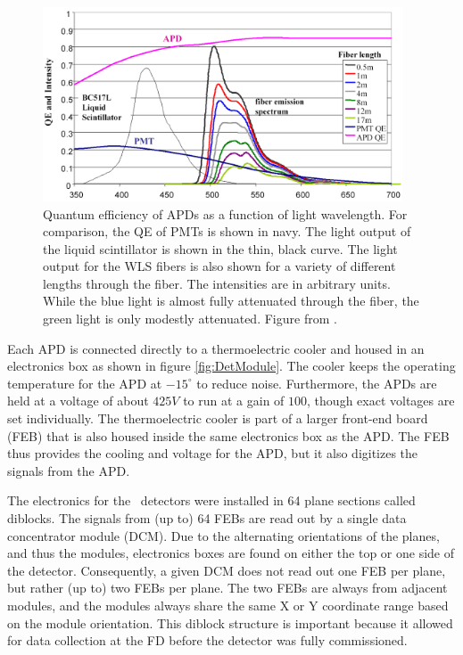 \begin{figure}[htb]
  \centering
  \includegraphics[width=0.95\textwidth]{figures/APDvsPMT.png}
  \caption[Quantum Efficiency of APDs and Light Intensity Output of WLS fibers]{Quantum efficiency of APDs as a function of light wavelength. For comparison, the QE of PMTs is shown in navy. The light output of the liquid scintillator is shown in the thin, black curve. The light output for the WLS fibers is also shown for a variety of different lengths through the fiber. The intensities are in arbitrary units. While the blue light is almost fully attenuated through the fiber, the green light is only modestly attenuated. Figure from \cite{ref:TDRNOvA}.}
  \label{fig:APDvsPMT}
\end{figure}

Each APD is connected directly to a thermoelectric cooler and housed in an electronics box as shown in figure \ref{fig:DetModule}. The cooler keeps the operating temperature for the APD at $-15^\circ$ to reduce noise. Furthermore, the APDs are held at a voltage of about $425\unit{V}$ to run at a gain of $100$, though exact voltages are set individually. The thermoelectric cooler is part of a larger front-end board (FEB) that is also housed inside the same electronics box as the APD. The FEB thus provides the cooling and voltage for the APD, but it also digitizes the signals from the APD.

The electronics for the \nova~detectors were installed in 64 plane sections called diblocks. The signals from (up to) 64 FEBs are read out by a single data concentrator module (DCM). Due to the alternating orientations of the planes, and thus the modules, electronics boxes are found on either the top or one side of the detector. Consequently, a given DCM does not read out one FEB per plane, but rather (up to) two FEBs per plane. The two FEBs are always from adjacent modules, and the modules always share the same X or Y coordinate range based on the module orientation. This diblock structure is important because it allowed for data collection at the FD before the detector was fully commissioned.

